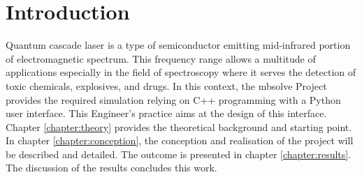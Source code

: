 \chapter{Introduction}
\label{chapter:introduction}

Quantum cascade laser is a type of semiconductor emitting mid-infrared portion of electromagnetic spectrum. This frequency range allows a multitude of applications especially in the field of spectroscopy where it serves the detection of toxic chemicals, explosives, and drugs. In this context, the mbsolve Project provides the required simulation relying on C++ programming with a Python user interface. This Engineer's practice aims at the design of this interface.\\
Chapter \ref{chapter:theory} provides the theoretical background and starting point. In chapter \ref{chapter:conception}, the conception and realisation of the project will be described and detailed. The outcome is presented in chapter \ref{chapter:results}. The discussion of the results concludes this work.




